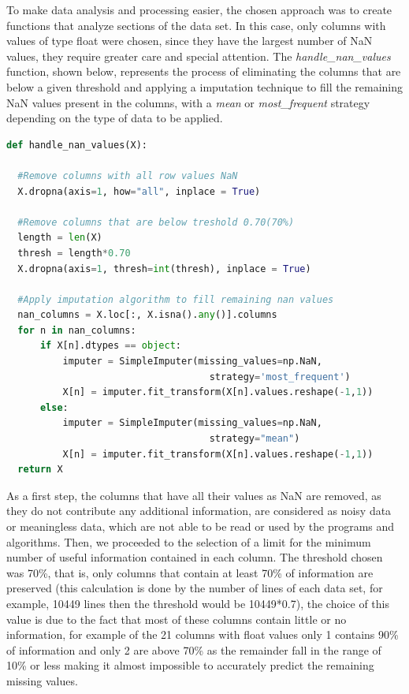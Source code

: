 To make data analysis and processing easier, the chosen approach was to create functions that analyze sections of the data set. In this case, only columns with values of type float were chosen, since they have the largest number of NaN values, they require greater care and special attention. The \textit{handle\_nan\_values} function, shown below, represents the process of eliminating the columns that are below a given threshold and applying a imputation technique to fill the remaining NaN values present in the columns, with a \textit{mean} or \textit{most\_frequent} strategy depending on the type of data to be applied.

\begin{lstlisting}[language=Python]
def handle_nan_values(X):

  #Remove columns with all row values NaN
  X.dropna(axis=1, how="all", inplace = True)
    
  #Remove columns that are below treshold 0.70(70%)
  length = len(X)
  thresh = length*0.70
  X.dropna(axis=1, thresh=int(thresh), inplace = True)
    
  #Apply imputation algorithm to fill remaining nan values
  nan_columns = X.loc[:, X.isna().any()].columns
  for n in nan_columns:
      if X[n].dtypes == object:
          imputer = SimpleImputer(missing_values=np.NaN, 
                                    strategy='most_frequent')
          X[n] = imputer.fit_transform(X[n].values.reshape(-1,1))
      else:
          imputer = SimpleImputer(missing_values=np.NaN, 
                                    strategy="mean")
          X[n] = imputer.fit_transform(X[n].values.reshape(-1,1))
  return X
\end{lstlisting}

\hspace{10px} As a first step, the columns that have all their values as NaN are removed, as they do not contribute any additional information, are considered as noisy data or meaningless data, which are not able to be read or used by the programs and algorithms. Then, we proceeded to the selection of a limit for the minimum number of useful information contained in each column. The threshold chosen was 70\%, that is, only columns that contain at least 70\% of information are preserved (this calculation is done by the number of lines of each data set, for example, 10449 lines then the threshold would be 10449*0.7), the choice of this value is due to the fact that most of these columns contain little or no information, for example of the 21 columns with float values only 1 contains 90\% of information and only 2 are above 70\% as the remainder fall in the range of 10\% or less making it almost impossible to accurately predict the remaining missing values. 

